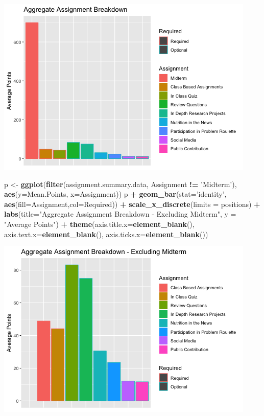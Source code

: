 \documentclass[]{article}
\newenvironment{Shaded}{\begin{snugshade}}{\end{snugshade}}
\newcommand{\KeywordTok}[1]{\textcolor[rgb]{0.13,0.29,0.53}{\textbf{#1}}}
\newcommand{\DataTypeTok}[1]{\textcolor[rgb]{0.13,0.29,0.53}{#1}}
\newcommand{\StringTok}[1]{\textcolor[rgb]{0.31,0.60,0.02}{#1}}
\newcommand{\OperatorTok}[1]{\textcolor[rgb]{0.81,0.36,0.00}{\textbf{#1}}}
\newcommand{\NormalTok}[1]{#1}
\begin{document}
\includegraphics{figures/points-from-assessments-summary-1.png}

\begin{Shaded}
\begin{Highlighting}[]
\NormalTok{p <-}\StringTok{ }\KeywordTok{ggplot}\NormalTok{(}\KeywordTok{filter}\NormalTok{(assignment.summary.data, Assignment }\OperatorTok{!=}\StringTok{ 'Midterm'}\NormalTok{), }\KeywordTok{aes}\NormalTok{(}\DataTypeTok{y=}\NormalTok{Mean.Points, }\DataTypeTok{x=}\NormalTok{Assignment))}
\NormalTok{p }\OperatorTok{+}\StringTok{ }\KeywordTok{geom_bar}\NormalTok{(}\DataTypeTok{stat=}\StringTok{'identity'}\NormalTok{, }\KeywordTok{aes}\NormalTok{(}\DataTypeTok{fill=}\NormalTok{Assignment,}\DataTypeTok{col=}\NormalTok{Required)) }\OperatorTok{+}\StringTok{ }\KeywordTok{scale_x_discrete}\NormalTok{(}\DataTypeTok{limits =}\NormalTok{ positions) }\OperatorTok{+}\StringTok{   }
\StringTok{  }\KeywordTok{labs}\NormalTok{(}\DataTypeTok{title=}\StringTok{"Aggregate Assignment Breakdown - Excluding Midterm"}\NormalTok{, }\DataTypeTok{y =} \StringTok{"Average Points"}\NormalTok{) }\OperatorTok{+}
\StringTok{  }\KeywordTok{theme}\NormalTok{(}\DataTypeTok{axis.title.x=}\KeywordTok{element_blank}\NormalTok{(),}
        \DataTypeTok{axis.text.x=}\KeywordTok{element_blank}\NormalTok{(),}
        \DataTypeTok{axis.ticks.x=}\KeywordTok{element_blank}\NormalTok{())}
\end{Highlighting}
\end{Shaded}

\includegraphics{figures/points-from-assessments-summary-2.png}
\end{document}
